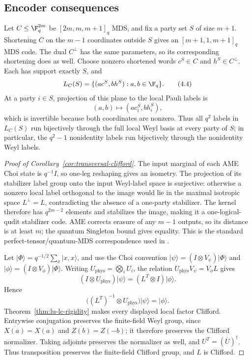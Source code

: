 \subsection{Encoder consequences}

Let \(C\leq\F_q^{2m}\) be \([2m,m,m+1]_q\) MDS, and fix a party set
\(S\) of size \(m+1\).  Shortening \(C\) on the \(m-1\) coordinates
outside \(S\) gives an \([m+1,1,m+1]_q\) MDS code.  The dual
\(C^\perp\) has the same parameters, so its corresponding shortening
does as well.  Choose nonzero shortened words
\(c^S\in C\) and \(h^S\in C^\perp\).  Each has support exactly \(S\),
and
\[
 L_C(S)=
 \{(ac^S,bh^S):a,b\in\F_q\}.                            \tag{4.4}
\]
At a party \(i\in S\), projection of this plane to the local Pauli labels
is
\[
 (a,b)\longmapsto(ac_i^S,bh_i^S),
\]
which is invertible because both coordinates are nonzero.  Thus all
\(q^2\) labels in \(L_C(S)\) run bijectively through the full local Weyl
basis at every party of \(S\); in particular, the \(q^2-1\)
nonidentity labels run bijectively through the nonidentity Weyl labels.

\begin{proof}[Proof of Corollary~\ref{cor:transversal-clifford}]
The input marginal of each AME Choi state is \(q^{-1}I\), so one-leg
reshaping gives an isometry.  The projection of its stabilizer label group
onto the input Weyl-label space is surjective: otherwise a nonzero local
label orthogonal to the image would lie in the maximal isotropic space
\(L^\perp=L\), contradicting the absence of a one-party stabilizer.  The
kernel therefore has \(q^{2m-2}\) elements and stabilizes the image, making
it a one-logical-qudit stabilizer code.  AME corrects erasure of any
\(m-1\) outputs, so its distance is at least \(m\); the quantum Singleton
bound gives equality.  This is the standard perfect-tensor/quantum-MDS
correspondence used in \cite[Theorems~3.5 and 3.6]{Tan2026}.

Let \(\lvert\Phi\rangle=q^{-1/2}\sum_x\lvert x,x\rangle\), and use the
Choi convention
\(\lvert\psi\rangle=(I\otimes V_\psi)\lvert\Phi\rangle\) and
\(\lvert\phi\rangle=(I\otimes V_\phi)\lvert\Phi\rangle\).
Writing \(U_{\mathrm{phys}}=\bigotimes_iU_i\), the relation
\(U_{\mathrm{phys}}V_\psi=V_\phi L\) gives
\[
 (I\otimes U_{\mathrm{phys}})\lvert\psi\rangle
   =(L^T\otimes I)\lvert\phi\rangle .
\]
Hence
\[
 \bigl((L^T)^{-1}\otimes U_{\mathrm{phys}}\bigr)
   \lvert\psi\rangle=\lvert\phi\rangle .
\]
Theorem~\ref{thm:lu-lc-rigidity} makes every displayed local factor
Clifford.  Entrywise conjugation preserves the finite-field Weyl group,
since \(\overline{X(a)}=X(a)\) and
\(\overline{Z(b)}=Z(-b)\); it therefore preserves the Clifford
normalizer.  Taking adjoints preserves the normalizer as well, and
\(U^T=(\overline U)^\dagger\).  Thus transposition preserves the
finite-field Clifford group, and \(L\) is Clifford.
\end{proof}

